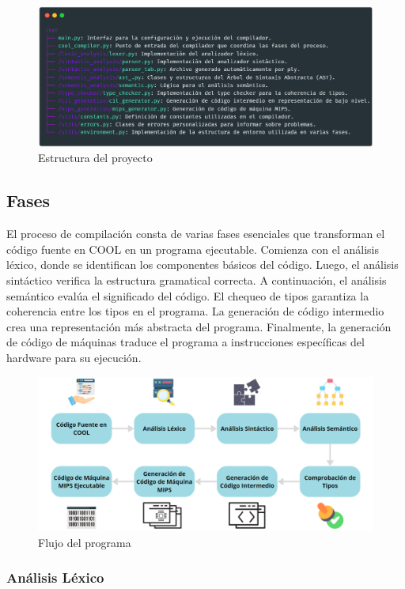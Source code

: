 \documentclass[10pt]{article} %
\begin{document}
	\begin{figure}[H]
		\centering
		\includegraphics[width=15cm]{structure}
		\caption{Estructura del proyecto}
	\end{figure}

	\subsection{Fases}
	
	El proceso de compilación consta de varias fases esenciales que transforman el código fuente en COOL en un programa ejecutable. Comienza con el análisis léxico, donde se identifican los componentes básicos del código. Luego, el análisis sintáctico verifica la estructura gramatical correcta. A continuación, el análisis semántico evalúa el significado del código. El chequeo de tipos garantiza la coherencia entre los tipos en el programa. La generación de código intermedio crea una representación más abstracta del programa. Finalmente, la generación de código de máquinas traduce el programa a instrucciones específicas del hardware para su ejecución. 
	
	\begin{figure}[H]
		\centering
		\includegraphics[width=13.5cm]{flow}
		\caption{Flujo del programa}
	\end{figure}
	
	\subsubsection{An\'alisis L\'exico}
	
\end{document}
